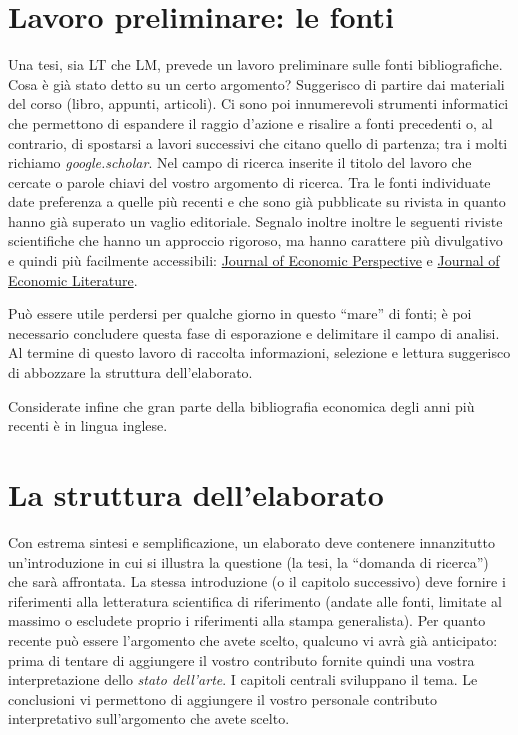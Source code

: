 \documentclass[12pt]{article}
\begin{document}
\section{Lavoro preliminare: le fonti}\label{sec:fonti}
Una tesi, sia LT che LM, prevede un lavoro preliminare sulle fonti
bibliografiche. Cosa \`e gi\`a stato detto su un certo argomento?
Suggerisco di partire dai materiali del corso (libro, appunti,
articoli). Ci sono poi innumerevoli strumenti informatici che
permettono di espandere il raggio d'azione e risalire a fonti
precedenti o, al contrario, di spostarsi a lavori successivi che
citano quello di partenza; tra i molti richiamo
\textit{google.scholar}. Nel campo di ricerca inserite il titolo del
lavoro che cercate o parole chiavi del vostro argomento di
ricerca. Tra le fonti individuate date preferenza a quelle pi\`u
recenti e che sono gi\`a pubblicate su rivista in quanto hanno gi\`a
superato un vaglio editoriale. Segnalo inoltre inoltre le seguenti
riviste scientifiche che hanno un approccio rigoroso, ma hanno
carattere pi\`u divulgativo e quindi pi\`u facilmente accessibili:
\href{https://www.aeaweb.org/journals/jep}{Journal of Economic
  Perspective} e \href{https://www.aeaweb.org/journals/jel}{Journal of
  Economic Literature}.

Pu\`o essere utile perdersi per qualche giorno in questo ``mare'' di
fonti; \`e poi necessario concludere questa fase di esporazione e
delimitare il campo di analisi. Al termine di questo lavoro di
raccolta informazioni, selezione e lettura suggerisco di abbozzare la
struttura dell'elaborato.

Considerate infine che gran parte della bibliografia economica degli
anni pi\`u recenti \`e in lingua inglese.



\section{La struttura dell'elaborato}
Con estrema sintesi e semplificazione, un elaborato deve contenere
innanzitutto un'introduzione in cui si illustra la questione (la tesi,
la ``domanda di ricerca'') che sar\`a affrontata. La stessa
introduzione (o il capitolo successivo) deve fornire i riferimenti
alla letteratura scientifica di riferimento (andate alle fonti,
limitate al massimo o escludete proprio i riferimenti alla stampa
generalista). Per quanto recente pu\`o essere l'argomento che avete
scelto, qualcuno vi avr\`a gi\`a anticipato: prima di tentare di
aggiungere il vostro contributo fornite quindi una vostra
interpretazione dello \textit{stato dell'arte}.  I capitoli centrali
sviluppano il tema. Le conclusioni vi permettono di aggiungere il
vostro personale contributo interpretativo sull'argomento che avete
scelto.
\end{document}
